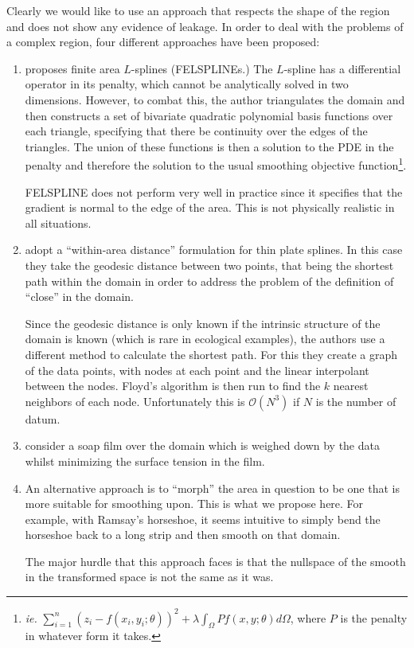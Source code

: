 \documentclass[a4paper,10pt]{amsart}
\begin{document}
Clearly we would like to use an approach that respects the shape of the region and does not show any evidence of leakage. In order to deal with the problems of a complex region, four different approaches have been proposed:

\begin{enumerate}
\item \cite{ramsay} proposes finite area $L$-splines (FELSPLINEs.) The $L$-spline has a differential operator in its penalty, which cannot be analytically solved in two dimensions. However, to combat this, the author triangulates the domain and then constructs a set of bivariate quadratic polynomial basis functions over each triangle, specifying that there be continuity over the edges of the triangles. The union of these functions is then a solution to the PDE in the penalty and therefore the solution to the usual smoothing objective function\footnote{\emph{ie.} $\sum_{i=1}^n (z_i-f(x_i,y_i;\theta))^2 + \lambda \int_\Omega Pf(x,y;\theta)d\Omega$, where $P$  is the penalty in whatever form it takes.}.

FELSPLINE does not perform very well in practice since it specifies that the gradient is normal to the edge of the area. This is not physically realistic in all situations.

\item \cite{wangranalli} adopt a ``within-area distance'' formulation for thin plate splines. In this case they take the geodesic distance between two points, that being the shortest path within the domain in order to address the problem of the definition of ``close'' in the domain. 

Since the geodesic distance is only known if the intrinsic structure of the domain is known (which is rare in ecological examples), the authors use a different method to calculate the shortest path. For this they create a graph of the data points, with nodes at each point and the linear interpolant between the nodes. Floyd's algorithm is then run to find the $k$ nearest neighbors of each node. Unfortunately this is $\mathcal{O}(N^3)$ if $N$ is the number of datum.


\item \cite{soap} consider a soap film over the domain which is weighed down by the data whilst minimizing the surface tension in the film.

\item An alternative approach is to ``morph'' the area in question to be one that is more suitable for smoothing upon. This is what we propose here. For example, with Ramsay's horseshoe, it seems intuitive to simply bend the horseshoe back to a long strip and then smooth on that domain.

The major hurdle that this approach faces is that the nullspace of the smooth in the transformed space is not the same as it was.



\end{enumerate}
\end{document}
